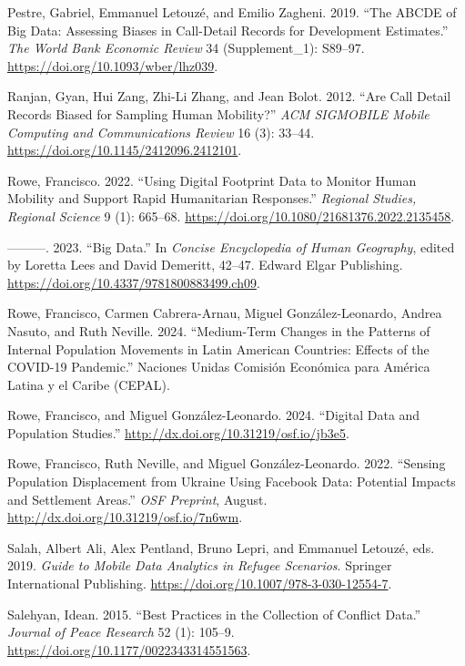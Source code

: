 \documentclass[
  sn-nature,
  11pt,
]{sn-jnl}
\newlength{\cslhangindent}
\newenvironment{CSLReferences}[2] %
 {\begin{list}{}{%
  \setlength{\itemindent}{0pt}
  \setlength{\leftmargin}{0pt}
  \setlength{\parsep}{0pt}
  \ifodd #1
   \setlength{\leftmargin}{\cslhangindent}
   \setlength{\itemindent}{-1\cslhangindent}
  \fi
  \setlength{\itemsep}{#2\baselineskip}}}
 {\end{list}}
\begin{document}
\begin{CSLReferences}{1}{0}
Pestre, Gabriel, Emmanuel Letouzé, and Emilio Zagheni. 2019. {``The
ABCDE of Big Data: Assessing Biases in Call-Detail Records for
Development Estimates.''} \emph{The World Bank Economic Review} 34
(Supplement{\_}1): S89--97. \url{https://doi.org/10.1093/wber/lhz039}.

Ranjan, Gyan, Hui Zang, Zhi-Li Zhang, and Jean Bolot. 2012. {``Are Call
Detail Records Biased for Sampling Human Mobility?''} \emph{ACM
SIGMOBILE Mobile Computing and Communications Review} 16 (3): 33--44.
\url{https://doi.org/10.1145/2412096.2412101}.

Rowe, Francisco. 2022. {``Using Digital Footprint Data to Monitor Human
Mobility and Support Rapid Humanitarian Responses.''} \emph{Regional
Studies, Regional Science} 9 (1): 665--68.
\url{https://doi.org/10.1080/21681376.2022.2135458}.

---------. 2023. {``Big Data.''} In \emph{{Concise Encyclopedia of Human
Geography}}, edited by Loretta Lees and David Demeritt, 42--47. Edward
Elgar Publishing. \url{https://doi.org/10.4337/9781800883499.ch09}.

Rowe, Francisco, Carmen Cabrera-Arnau, Miguel González-Leonardo, Andrea
Nasuto, and Ruth Neville. 2024. {``Medium-Term Changes in the Patterns
of Internal Population Movements in Latin American Countries: Effects of
the COVID-19 Pandemic.''} Naciones Unidas Comisi{ó}n Econ{ó}mica para
Am{é}rica Latina y el Caribe (CEPAL).

Rowe, Francisco, and Miguel González-Leonardo. 2024. {``Digital Data and
Population Studies.''} \url{http://dx.doi.org/10.31219/osf.io/jb3e5}.

Rowe, Francisco, Ruth Neville, and Miguel González-Leonardo. 2022.
{``Sensing Population Displacement from Ukraine Using Facebook Data:
Potential Impacts and Settlement Areas.''} \emph{OSF Preprint}, August.
\url{http://dx.doi.org/10.31219/osf.io/7n6wm}.

Salah, Albert Ali, Alex Pentland, Bruno Lepri, and Emmanuel Letouzé,
eds. 2019. \emph{Guide to Mobile Data Analytics in Refugee Scenarios}.
Springer International Publishing.
\url{https://doi.org/10.1007/978-3-030-12554-7}.

Salehyan, Idean. 2015. {``Best Practices in the Collection of Conflict
Data.''} \emph{Journal of Peace Research} 52 (1): 105--9.
\url{https://doi.org/10.1177/0022343314551563}.


\end{CSLReferences}
\end{document}
